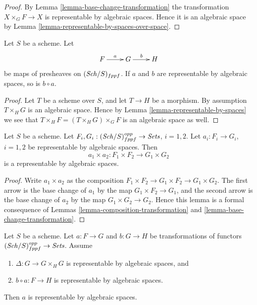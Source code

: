 \begin{proof}
By Lemma \ref{lemma-base-change-transformation} the transformation
$X \times_G F \to X$ is representable by algebraic spaces. Hence it is
an algebraic space by
Lemma \ref{lemma-representable-by-spaces-over-space}.
\end{proof}

\begin{lemma}
\label{lemma-composition-transformation}
Let $S$ be a scheme.
Let
$$
\xymatrix{
F \ar[r]^a & G \ar[r]^b & H
}
$$
be maps of presheaves on $(\mathit{Sch}/S)_{fppf}$.
If $a$ and $b$ are representable by algebraic spaces, so is
$b \circ a$.
\end{lemma}

\begin{proof}
Let $T$ be a scheme over $S$, and let $T \to H$ be a morphism.
By assumption $T \times_H G$ is an algebraic space. Hence by
Lemma \ref{lemma-representable-by-spaces}
we see that $T \times_H F = (T \times_H G) \times_G F$ is an
algebraic space as well.
\end{proof}

\begin{lemma}
\label{lemma-product-transformations}
Let $S$ be a scheme.
Let $F_i, G_i : (\mathit{Sch}/S)_{fppf}^{opp} \to \textit{Sets}$, $i = 1, 2$.
Let $a_i : F_i \to G_i$, $i = 1, 2$
be representable by algebraic spaces.
Then
$$
a_1 \times a_2 : F_1 \times F_2 \longrightarrow G_1 \times G_2
$$
is a representable by algebraic spaces.
\end{lemma}

\begin{proof}
Write $a_1 \times a_2$ as the composition
$F_1 \times F_2 \to G_1 \times F_2 \to G_1 \times G_2$.
The first arrow is the base change of $a_1$ by the map
$G_1 \times F_2 \to G_1$, and the second arrow
is the base change of $a_2$ by the map
$G_1 \times G_2 \to G_2$. Hence this lemma is a formal
consequence of Lemmas \ref{lemma-composition-transformation}
and \ref{lemma-base-change-transformation}.
\end{proof}

\begin{lemma}
\label{lemma-representable-by-spaces-permanence}
Let $S$ be a scheme. Let $a : F \to G$ and $b : G \to H$ be
transformations of functors $(\mathit{Sch}/S)_{fppf}^{opp} \to \textit{Sets}$.
Assume
\begin{enumerate}
\item $\Delta : G \to G \times_H G$ is representable
by algebraic spaces, and
\item $b \circ a : F \to H$ is representable by algebraic spaces.
\end{enumerate}
Then $a$ is representable by algebraic spaces.
\end{lemma}

